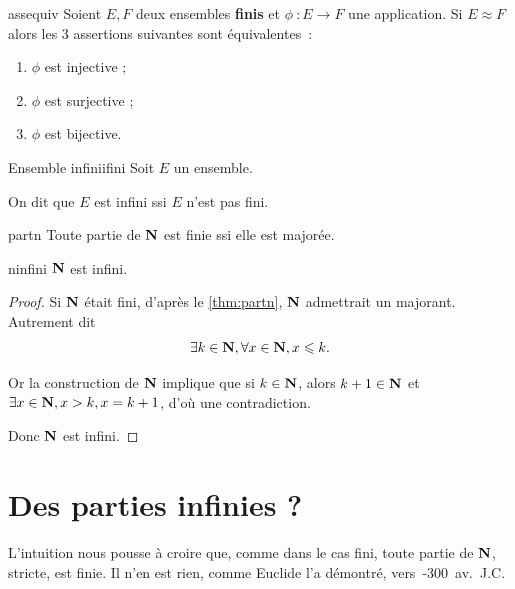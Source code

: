\documentclass[a4paper,french,final]{memoir}
\begin{document}
\begin{theoremb}{}{assequiv}
	Soient $E, F$ deux ensembles \textbf{finis} et $\phi~: E \to F$ une application. Si $E \mathrel{\approx} F$ alors les 3 assertions suivantes sont équivalentes~:
	
	\begin{enumerate}
		\item $\phi$ est injective ;
		\item $\phi$ est surjective ;
		\item $\phi$ est bijective. 
	\end{enumerate}
\end{theoremb}

\begin{defb}{Ensemble infini}{ifini}
	Soit $E$ un ensemble.
	
	On dit que $E$ est infini ssi $E$ n'est pas fini.
\end{defb}

\begin{theoremb}{}{partn} 
	Toute partie de $\mathbf{N}$ est finie ssi elle est majorée. 
\end{theoremb}



\begin{theoremb}{}{ninfini}
	$\mathbf{N}$ est infini. 
\end{theoremb}


\begin{proof}
	Si $\mathbf{N}$ était fini, d'après le \cref{thm:partn}, $\mathbf{N}$ admettrait un majorant. Autrement dit \[\exists k \in \mathbf{N}, \forall x \in \mathbf{N}, x \leqslant k.\]

	Or la construction de $\mathbf{N}$ implique que si $ k \in \mathbf{N}$, alors $k + 1 \in \mathbf{N}$ et $\exists x \in \mathbf{N}, x > k, x= k+1$, d'où une contradiction. 
	
	Donc $\mathbf{N}$ est infini.
\end{proof}
\section{Des parties infinies ?}
L'intuition nous pousse à croire que, comme dans le cas fini, toute partie de $\mathbf{N}$, stricte, est finie. Il n'en est rien, comme Euclide l'a démontré, vers~-300~av.~J.C. 
\end{document}
